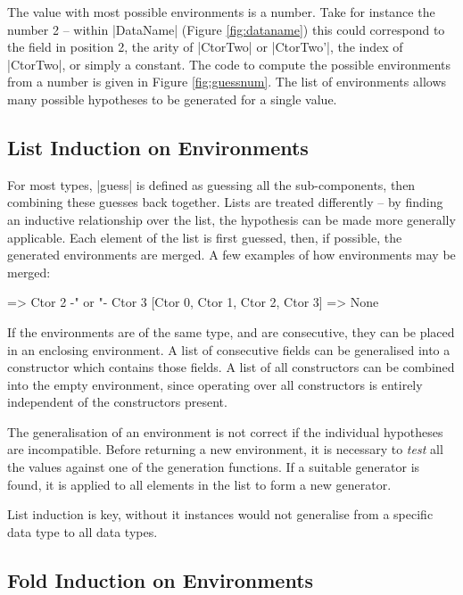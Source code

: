 \documentclass{llncs}
\begin{document}
The value with most possible environments is a number. Take for instance the number 2 -- within |DataName| (Figure \ref{fig:dataname}) this could correspond to the field in position 2, the arity of |CtorTwo| or |CtorTwo'|, the index of |CtorTwo|, or simply a constant. The code to compute the possible environments from a number is given in Figure \ref{fig:guessnum}. The list of environments allows many possible hypotheses to be generated for a single value.


\subsection{List Induction on Environments}
\label{sec:induction}

For most types, |guess| is defined as guessing all the sub-components, then combining these guesses back together. Lists are treated differently -- by finding an inductive relationship over the list, the hypothesis can be made more generally applicable. Each element of the list is first guessed, then, if possible, the generated environments are merged. A few examples of how environments may be merged:

\begin{code}
                => Ctor 2 {-" \;\; or \;\; "-} Ctor 3
[Ctor 0, Ctor 1, Ctor 2, Ctor 3]  => None
\end{code}

If the environments are of the same type, and are consecutive, they can be placed in an enclosing environment. A list of consecutive fields can be generalised into a constructor which contains those fields. A list of all constructors can be combined into the empty environment, since operating over all constructors is entirely independent of the constructors present.

The generalisation of an environment is not correct if the individual hypotheses are incompatible. Before returning a new environment, it is necessary to \textit{test} all the values against one of the generation functions. If a suitable generator is found, it is applied to all elements in the list to form a new generator.

List induction is key, without it instances would not generalise from a specific data type to all data types.

\subsection{Fold Induction on Environments}
\label{sec:fold}
\end{document}

